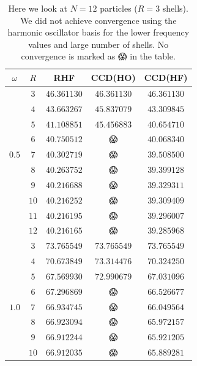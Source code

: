 \documentclass[
    a4paper, aps, twocolumn, floatfix, superscriptaddress,
    nofootinbib]{revtex4-1}
\newcommand{\nan}{{\DejaSans 😱}}
\newcommand{\1}{\mathds{1}}
\begin{document}
        \begin{table}
            \centering
            \caption{Here we look at $N = 12$ particles ($R = 3$ shells).  We did
            not achieve convergence using the harmonic oscillator basis for the
            lower frequency values and large number of shells. No convergence is
            marked as {\nan} in the table.}
            \begin{ruledtabular}
                \begin{tabular}{c|c|ccc}
                    $\omega$ & $R$ & RHF & CCD(HO) & CCD(HF) \\
                    \hline
                          & $3$ & $46.361130$ & $46.361130$ & $46.361130$ \\
                          & $4$ & $43.663267$ & $45.837079$ & $43.309845$ \\
                          & $5$ & $41.108851$ & $45.456883$ & $40.654710$ \\
                          & $6$ & $40.750512$ & \nan & $40.068340$ \\
                    $0.5$ & $7$ & $40.302719$ & \nan & $39.508500$ \\
                          & $8$ & $40.263752$ & \nan & $39.399128$ \\
                          & $9$ & $40.216688$ & \nan & $39.329311$ \\
                          & $10$ & $40.216252$ & \nan & $39.309409$ \\
                          & $11$ & $40.216195$ & \nan & $39.296007$ \\
                          & $12$ & $40.216165$ & \nan & $39.285968$ \\
                    \hline
                          & $3$ & $73.765549$ & $73.765549$ & $73.765549$ \\
                          & $4$ & $70.673849$ & $73.314476$ & $70.324250$ \\
                          & $5$ & $67.569930$ & $72.990679$ & $67.031096$ \\
                          & $6$ & $67.296869$ & \nan & $66.526677$ \\
                    $1.0$ & $7$ & $66.934745$ & \nan & $66.049564$ \\
                          & $8$ & $66.923094$ & \nan & $65.972157$ \\
                          & $9$ & $66.912244$ & \nan & $65.921205$ \\
                          & $10$ & $66.912035$ & \nan & $65.889281$ \\

\end{tabular}
\end{ruledtabular}
\end{table}
\end{document}
